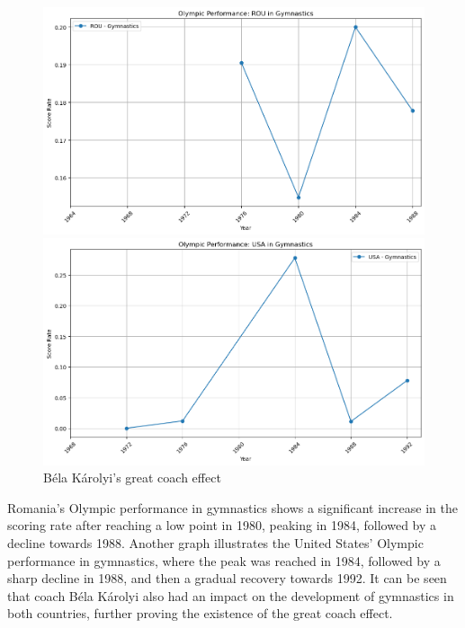 \documentclass[12pt]{article}
\begin{document}
\begin{figure}[h]
	\begin{minipage}[b]{0.5\textwidth}
		\centering
		\includegraphics[width=1\textwidth]{figure/Béla_Károlyi_rou.png}
	\end{minipage}
	\begin{minipage}[b]{0.5\textwidth}
		\centering
		\includegraphics[width=1\textwidth]{figure/Béla_Károlyi_usa.png}
	\end{minipage}
	\caption{Béla Károlyi's great coach effect}\label{fig3}
\end{figure}

Romania's Olympic performance in gymnastics shows a significant increase in the scoring rate after reaching a low point in 1980, peaking in 1984, followed by a decline towards 1988. Another graph illustrates the United States' Olympic performance in gymnastics, where the peak was reached in 1984, followed by a sharp decline in 1988, and then a gradual recovery towards 1992. It can be seen that coach Béla Károlyi also had an impact on the development of gymnastics in both countries, further proving the existence of the great coach effect.\\
\end{document}

